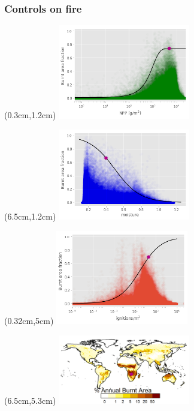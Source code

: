 \addtocounter{framenumber}{-1}
\begin{frame}
	\frametitle{Controls on fire}
	\begin{textblock*}{14cm}(0.3cm,1.2cm)
		\includegraphics[width=5.78cm]{images/limitCurves/Savanna/NPPVsFire}	
	\end{textblock*}
	\begin{textblock*}{14cm}(6.5cm,1.2cm)
		\includegraphics[width=5.78cm]{images/limitCurves/Savanna/alphaVsFire}	
	\end{textblock*}
	\begin{textblock*}{14cm}(0.32cm,5cm)
		\includegraphics[width=5.78cm]{images/limitCurves/Savanna/ignitionsVsFire.png}		
	\end{textblock*}
	\begin{textblock*}{14cm}(6.5cm,5.3cm)
		\includegraphics[width=5.78cm]{images/limitCurves/Savanna/fireMap.png}		
	\end{textblock*}
\end{frame}


